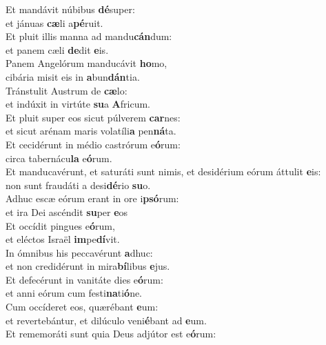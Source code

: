 \oddverse Et mandávit núbibus \textbf{dé}super:~\*\\
\oddverse et jánuas \textbf{cæ}li a\textbf{pé}ruit.\\
\evenverse Et pluit illis manna ad mandu\textbf{cán}dum:~\*\\
\evenverse et panem cæli \textbf{de}dit \textbf{e}is.\\
\oddverse Panem Angelórum manducávit \textbf{ho}mo,~\*\\
\oddverse cibária misit eis in \textbf{a}bun\textbf{dán}tia.\\
\evenverse Tránstulit Austrum de \textbf{cæ}lo:~\*\\
\evenverse et indúxit in virtúte \textbf{su}a \textbf{A}fricum.\\
\oddverse Et pluit super eos sicut púlverem \textbf{car}nes:~\*\\
\oddverse et sicut arénam maris volatíli\textbf{a} pen\textbf{ná}ta.\\
\evenverse Et cecidérunt in médio castrórum e\textbf{ó}rum:~\*\\
\evenverse circa tabernácu\textbf{la} e\textbf{ó}rum.\\
\oddverse Et manducavérunt, et saturáti sunt nimis, et desidérium eórum áttulit \textbf{e}is:~\*\\
\oddverse non sunt fraudáti a desi\textbf{dé}rio \textbf{su}o.\\
\evenverse Adhuc escæ eórum erant in ore i\textbf{psó}rum:~\*\\
\evenverse et ira Dei ascéndit \textbf{su}per \textbf{e}os\\
\oddverse Et occídit pingues e\textbf{ó}rum,~\*\\
\oddverse et eléctos Israël \textbf{im}pe\textbf{dí}vit.\\
\evenverse In ómnibus his peccavérunt \textbf{a}dhuc:~\*\\
\evenverse et non credidérunt in mira\textbf{bí}libus \textbf{e}jus.\\
\oddverse Et defecérunt in vanitáte dies e\textbf{ó}rum:~\*\\
\oddverse et anni eórum cum festi\textbf{na}ti\textbf{ó}ne.\\
\evenverse Cum occíderet eos, quærébant \textbf{e}um:~\*\\
\evenverse et revertebántur, et dilúculo veni\textbf{é}bant ad \textbf{e}um.\\
\oddverse Et rememoráti sunt quia Deus adjútor est e\textbf{ó}rum:~\*\\
